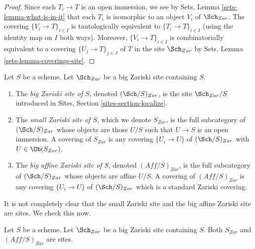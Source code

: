 \begin{proof}
Since each $T_i \to T$ is an open immersion, we see by
Sets, Lemma \ref{sets-lemma-what-is-in-it}
that each $T_i$ is isomorphic to an object $V_i$ of $\Sch_{Zar}$.
The covering $\{V_i \to T\}_{i \in I}$ is tautologically equivalent
to $\{T_i \to T\}_{i \in I}$ (using the identity map on $I$ both ways).
Moreover, $\{V_i \to T\}_{i \in I}$ is combinatorially equivalent to a
covering $\{U_j \to T\}_{j \in J}$ of $T$ in the site $\Sch_{Zar}$ by
Sets, Lemma \ref{sets-lemma-coverings-site}.
\end{proof}

\begin{definition}
\label{definition-big-small-Zariski}
Let $S$ be a scheme. Let $\Sch_{Zar}$ be a big Zariski
site containing $S$.
\begin{enumerate}
\item The {\it big Zariski site of $S$}, denoted
$(\Sch/S)_{Zar}$, is the site $\Sch_{Zar}/S$
introduced in Sites, Section \ref{sites-section-localize}.
\item The {\it small Zariski site of $S$}, which we denote
$S_{Zar}$, is the full subcategory of $(\Sch/S)_{Zar}$
whose objects are those $U/S$ such that $U \to S$ is an open immersion.
A covering of $S_{Zar}$ is any covering $\{U_i \to U\}$ of
$(\Sch/S)_{Zar}$ with $U \in \Ob(S_{Zar})$.
\item The {\it big affine Zariski site of $S$}, denoted
$(\textit{Aff}/S)_{Zar}$, is the full subcategory of
$(\Sch/S)_{Zar}$ whose objects are affine $U/S$.
A covering of $(\textit{Aff}/S)_{Zar}$ is any covering
$\{U_i \to U\}$ of $(\Sch/S)_{Zar}$ which is a
standard Zariski covering.
\end{enumerate}
\end{definition}

\noindent
It is not completely clear that the small Zariski site and
the big affine Zariski site are sites. We check this now.

\begin{lemma}
\label{lemma-verify-site-Zariski}
Let $S$ be a scheme. Let $\Sch_{Zar}$ be a big Zariski
site containing $S$.
Both $S_{Zar}$ and $(\textit{Aff}/S)_{Zar}$ are sites.
\end{lemma}

